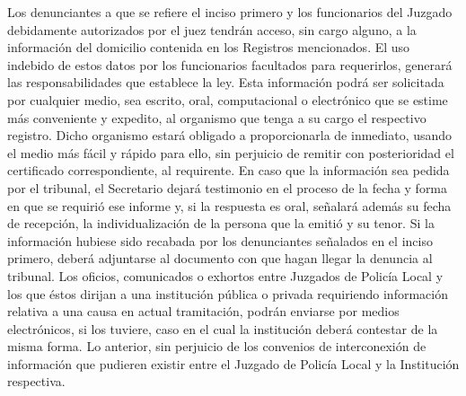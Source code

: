     Los denunciantes a que se refiere el inciso primero y los funcionarios del Juzgado debidamente autorizados por el juez tendrán acceso, sin cargo alguno, a la información del domicilio contenida en los Registros mencionados. El uso indebido de estos datos por los funcionarios facultados para requerirlos, generará las responsabilidades que establece la ley.
    Esta información podrá ser solicitada por cualquier medio, sea escrito, oral, computacional o electrónico que se estime más conveniente y expedito, al organismo que tenga a su cargo el respectivo registro. Dicho organismo estará obligado a proporcionarla de inmediato, usando el medio más fácil y rápido para ello, sin perjuicio de remitir con posterioridad el certificado correspondiente, al requirente.
    En caso que la información sea pedida por el tribunal, el Secretario dejará testimonio en el proceso de la fecha y forma en que se requirió ese informe y, si la respuesta es oral, señalará además su fecha de recepción, la individualización de la persona que la emitió y su tenor. Si la información hubiese sido recabada por los denunciantes señalados en el inciso primero, deberá adjuntarse al documento con que hagan llegar la denuncia al tribunal.
    Los oficios, comunicados o exhortos entre Juzgados de Policía Local y los que éstos dirijan a una institución pública o privada requiriendo información relativa a una causa en actual tramitación, podrán enviarse por medios electrónicos, si los tuviere, caso en el cual la institución deberá contestar de la misma forma. Lo anterior, sin perjuicio de los convenios de interconexión de información que pudieren existir entre el Juzgado de Policía Local y la Institución respectiva.







